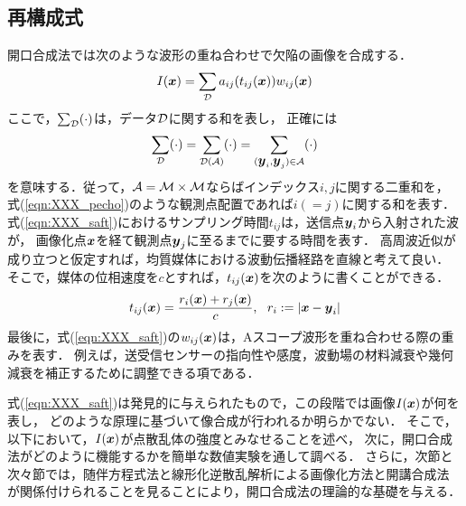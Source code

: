 \subsection{再構成式}
開口合成法では次のような波形の重ね合わせで欠陥の画像を合成する．
\begin{equation}
	I(\mbox{\boldmath $x$})=\sum_{\cal D}a_{ij}(t_{ij}(\mbox{\boldmath $x$}))w_{ij}(\mbox{\boldmath $x$})
	\label{eqn:XXX_saft}
\end{equation}
ここで，$\sum_{\cal D}(\cdot)$は，データ$\cal D$に関する和を表し，
正確には
\begin{equation}
	\sum_{\cal D} 
	(\cdot)
	=
	\sum_{\cal D(A)}
	(\cdot)
	=
	\sum_{(\mbox{\boldmath $y$}_i,\mbox{\boldmath $y$}_j)\in{\cal A}}
	(\cdot)
	\label{eqn:XXX_sum_D}
\end{equation}
を意味する．従って，${\cal A}= {\cal M}\times{\cal M}$ならばインデックス$i,j$に関する二重和を，
式(\ref{eqn:XXX_pecho})のような観測点配置であれば$i(=j)$に関する和を表す．
式(\ref{eqn:XXX_saft})におけるサンプリング時間$t_{ij}$は，送信点$\mbox{\boldmath $y$}_i$から入射された波が，
画像化点$\mbox{\boldmath $x$}$を経て観測点$\mbox{\boldmath $y$}_j$に至るまでに要する時間を表す．
高周波近似が成り立つと仮定すれば，均質媒体における波動伝播経路を直線と考えて良い．
そこで，媒体の位相速度を$c$とすれば，$t_{ij}(\mbox{\boldmath $x$})$を次のように書くことができる．
\begin{equation}
	t_{ij}(\mbox{\boldmath $x$})=\frac{r_i(\mbox{\boldmath $x$})+r_j(\mbox{\boldmath $x$})}{c}, \ \ r_i:=\left| \mbox{\boldmath $x$} -\mbox{\boldmath $y$}_i\right|
	\label{eqn:XXX_tij}
\end{equation}
最後に，式(\ref{eqn:XXX_saft})の$w_{ij}(\mbox{\boldmath $x$})$は，Aスコープ波形を重ね合わせる際の重みを表す．
例えば，送受信センサーの指向性や感度，波動場の材料減衰や幾何減衰を補正するために調整できる項である．

式(\ref{eqn:XXX_saft})は発見的に与えられたもので，この段階では画像$I(\mbox{\boldmath $x$})$が何を表し，
どのような原理に基づいて像合成が行われるか明らかでない．
そこで，以下において，$I(\mbox{\boldmath $x$})$が点散乱体の強度とみなせることを述べ，
次に，開口合成法がどのように機能するかを簡単な数値実験を通して調べる．
さらに，次節と次々節では，随伴方程式法と線形化逆散乱解析による画像化方法と開講合成法
が関係付けられることを見ることにより，開口合成法の理論的な基礎を与える．
